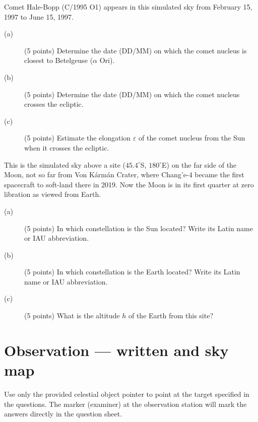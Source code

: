 Comet Hale-Bopp (C/1995 O1) appears in this simulated sky from February 15,
1997 to June 15, 1997.

\begin{description}
\item[(a)] (5 points) Determine the date (DD/MM) on which the comet nucleus is
  closest to Betelgeuse ($\alpha$ Ori).
\item[(b)] (5 points) Determine the date (DD/MM) on which the comet nucleus
  crosses the ecliptic.
\item[(c)] (5 points) Estimate the elongation $\varepsilon$ of the comet
  nucleus from the Sun when it crosses the ecliptic.
\end{description}

This is the simulated sky above a site ($45.4^\circ$S, $180^\circ$E) on the
far side of the Moon, not so far from Von K\'arm\'an Crater, where Chang'e-4
became the first spacecraft to soft-land there in 2019. Now the Moon is in its
first quarter at zero libration as viewed from Earth.

\begin{description}
\item[(a)] (5 points) In which constellation is the Sun located? Write its
  Latin name or IAU abbreviation.
\item[(b)] (5 points) In which constellation is the Earth located? Write its
  Latin name or IAU abbreviation.
\item[(c)] (5 points) What is the altitude $h$ of the Earth from this site?
\end{description}

\clearpage

\section*{Observation --- written and sky map}

Use only the provided celestial object pointer to point at the target
specified in the questions. The marker (examiner) at the observation station
will mark the answers directly in the question sheet.

